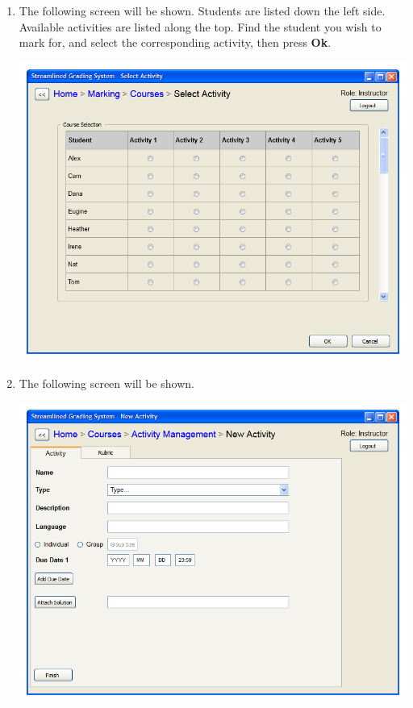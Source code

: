\documentclass{article}
\begin{document}
\begin{enumerate}
\begin{center}
    \end{center}
  \item The following screen will be shown.  Students are listed down the left
    side. Available activities are listed along the top.  Find the student you
    wish to mark for, and select the corresponding activity, then press \textbf{Ok}.
  \begin{center} 
     \includegraphics[scale=0.55]{../images/UIMockups/pngs/StudentActivitySelectionM}
  \end{center} 
  \item The following screen will be shown.
   \begin{center} 
   \includegraphics[scale=0.55]{../images/UIMockups/pngs/newActivity}

\end{center}
\end{enumerate}
\end{document}
